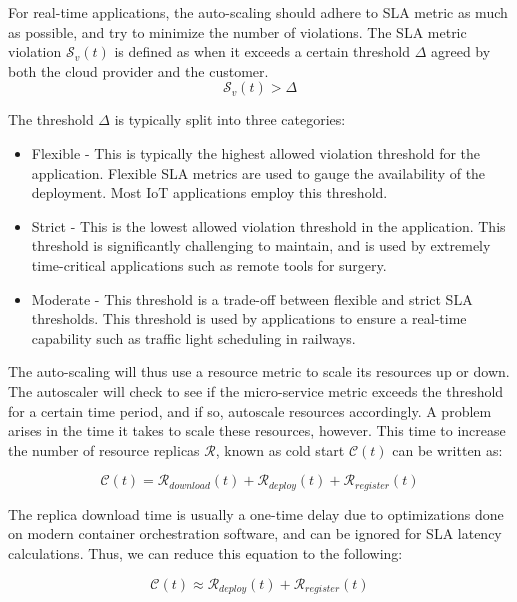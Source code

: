 For real-time applications, the auto-scaling should adhere to SLA metric as much as possible, and try to minimize the number of violations. The SLA metric violation $\mathcal{S}_{v}(t)$ is defined as when it exceeds a certain threshold $\Delta$ agreed by both the cloud provider and the customer.
\begin{equation}
    \mathcal{S}_{v}(t) > \Delta
\end{equation}

The threshold $\Delta$ is typically split into three categories:
\begin{itemize}
    \item Flexible - This is typically the highest allowed violation threshold for the application. Flexible SLA metrics are used to gauge the availability of the deployment. Most IoT applications employ this threshold.
    \item Strict - This is the lowest allowed violation threshold in the application. This threshold is significantly challenging to maintain, and is used by extremely time-critical applications such as remote tools for surgery.
    \item Moderate - This threshold is a trade-off between flexible and strict SLA thresholds. This threshold is used by applications to ensure a real-time capability such as traffic light scheduling in railways.
\end{itemize}

The auto-scaling will thus use a resource metric to scale its resources up or down. The autoscaler will check to see if the micro-service metric exceeds the threshold for a certain time period, and if so, autoscale resources accordingly. A problem arises in the time it takes to scale these resources, however. This time to increase the number of resource replicas $\mathcal{R}$, known as cold start $\mathcal{C}(t)$ can be written as:

\begin{equation}
    \mathcal{C}(t) = \mathcal{R}_{download}(t) + \mathcal{R}_{deploy}(t) + \mathcal{R}_{register}(t)
\end{equation}

The replica download time is usually a one-time delay due to optimizations done on modern container orchestration software, and can be ignored for SLA latency calculations. Thus, we can reduce this equation to the following:

\begin{equation}
    \mathcal{C}(t) \approx \mathcal{R}_{deploy}(t) + \mathcal{R}_{register}(t)
\end{equation}


